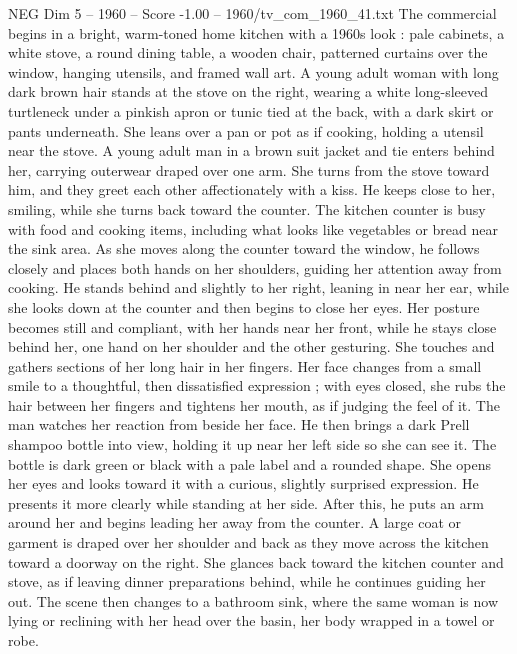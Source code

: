 \begin{textsample}{NEG Dim 5 – 1960 – Score -1.00 – 1960/tv\_com\_1960\_41.txt}  \label{ex:f5_neg_044}
The commercial begins in a bright, warm-toned home kitchen with a 1960s look : pale cabinets, a white stove, a round dining table, a wooden chair, patterned curtains over the window, hanging utensils, and framed wall art.
A young adult woman with long dark brown hair stands at the stove on the right, wearing a white long-sleeved turtleneck under a pinkish apron or tunic tied at the back, with a dark skirt or pants underneath.
She leans over a pan or pot as if cooking, holding a utensil near the stove.
A young adult man in a brown suit jacket and tie enters behind her, carrying outerwear draped over one arm.
She turns from the stove toward him, and they greet each other affectionately with a kiss.
He keeps close to her, smiling, while she turns back toward the counter.
The kitchen counter is busy with food and cooking items, including what looks like vegetables or bread near the sink area.
As she moves along the counter toward the window, he follows closely and places both hands on her shoulders, guiding her attention away from cooking.
He stands behind and slightly to her right, leaning in near her ear, while she looks down at the counter and then begins to close her eyes.
Her posture becomes still and compliant, with her hands near her front, while he stays close behind her, one hand on her shoulder and the other gesturing.
She touches and gathers sections of her long hair in her fingers.
Her face changes from a small smile to a thoughtful, then dissatisfied expression ; with eyes closed, she rubs the hair between her fingers and tightens her mouth, as if judging the feel of it.
The man watches her reaction from beside her face.
He then brings a dark Prell shampoo bottle into view, holding it up near her left side so she can see it.
The bottle is dark green or black with a pale label and a rounded shape.
She opens her eyes and looks toward it with a curious, slightly surprised expression.
He presents it more clearly while standing at her side.
After this, he puts an arm around her and begins leading her away from the counter.
A large coat or garment is draped over her shoulder and back as they move across the kitchen toward a doorway on the right.
She glances back toward the kitchen counter and stove, as if leaving dinner preparations behind, while he continues guiding her out.
The scene then changes to a bathroom sink, where the same woman is now lying or reclining with her head over the basin, her body wrapped in a towel or robe.

\end{textsample}
